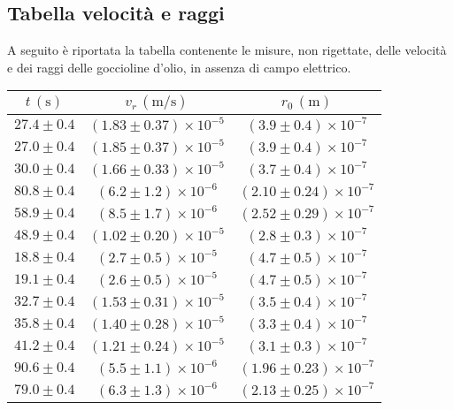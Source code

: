 \subsection{Tabella velocità e raggi}
A seguito è riportata la tabella contenente le misure, non rigettate, delle velocità e dei raggi delle goccioline d'olio, in assenza di campo elettrico.
        \renewcommand{\arraystretch}{1.3} %
        \begin{longtable}[C]{|c|c|c|}
            \hline
            $t \, (\mathrm{s})$ & $v_r \, (\mathrm{m/s})$ & $r_0 \, (\mathrm{m})$ \\
            \hline
            $27.4 \pm 0.4$ & $(1.83 \pm 0.37) \times 10^{-5}$ & $(3.9 \pm 0.4) \times 10^{-7}$ \\
            \hline
            $27.0 \pm 0.4$ & $(1.85 \pm 0.37) \times 10^{-5}$ & $(3.9 \pm 0.4) \times 10^{-7}$ \\
            \hline
            $30.0 \pm 0.4$ & $(1.66 \pm 0.33) \times 10^{-5}$ & $(3.7 \pm 0.4) \times 10^{-7}$ \\
            \hline
            $80.8 \pm 0.4$ & $(6.2 \pm 1.2) \times 10^{-6}$ & $(2.10 \pm 0.24) \times 10^{-7}$ \\
            \hline
            $58.9 \pm 0.4$ & $(8.5 \pm 1.7) \times 10^{-6}$ & $(2.52 \pm 0.29) \times 10^{-7}$ \\
            \hline
            $48.9 \pm 0.4$ & $(1.02 \pm 0.20) \times 10^{-5}$ & $(2.8 \pm 0.3) \times 10^{-7}$ \\
            \hline
            $18.8 \pm 0.4$ & $(2.7 \pm 0.5) \times 10^{-5}$ & $(4.7 \pm 0.5) \times 10^{-7}$ \\
            \hline
            $19.1 \pm 0.4$ & $(2.6 \pm 0.5) \times 10^{-5}$ & $(4.7 \pm 0.5) \times 10^{-7}$ \\
            \hline
            $32.7 \pm 0.4$ & $(1.53 \pm 0.31) \times 10^{-5}$ & $(3.5 \pm 0.4) \times 10^{-7}$ \\
            \hline
            $35.8 \pm 0.4$ & $(1.40 \pm 0.28) \times 10^{-5}$ & $(3.3 \pm 0.4) \times 10^{-7}$ \\
            \hline
            $41.2 \pm 0.4$ & $(1.21 \pm 0.24) \times 10^{-5}$ & $(3.1 \pm 0.3) \times 10^{-7}$ \\
            \hline
            $90.6 \pm 0.4$ & $(5.5 \pm 1.1) \times 10^{-6}$ & $(1.96 \pm 0.23) \times 10^{-7}$ \\
            \hline
            $79.0 \pm 0.4$ & $(6.3 \pm 1.3) \times 10^{-6}$ & $(2.13 \pm 0.25) \times 10^{-7}$ \\

\end{longtable}
